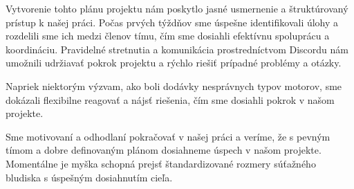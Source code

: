 Vytvorenie tohto plánu projektu nám poskytlo jasné usmernenie a štruktúrovaný prístup k našej práci. Počas prvých týždňov sme úspešne identifikovali úlohy a rozdelili sme ich medzi členov tímu, čím sme dosiahli efektívnu spoluprácu a koordináciu. Pravidelné stretnutia a komunikácia prostredníctvom Discordu nám umožnili udržiavať pokrok projektu a rýchlo riešiť prípadné problémy a otázky.

Napriek niektorým výzvam, ako boli dodávky nesprávnych typov motorov, sme dokázali flexibilne reagovať a nájsť riešenia, čím sme dosiahli pokrok v našom projekte.

Sme motivovaní a odhodlaní pokračovať v našej práci a veríme, že s pevným tímom a dobre definovaným plánom dosiahneme úspech v našom projekte. Momentálne je myška schopná prejsť štandardizované rozmery súťažného bludiska s úspešným dosiahnutím cieľa.